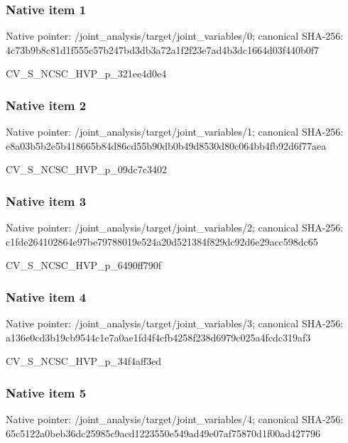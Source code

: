 \documentclass[10pt,a4paper]{article}
\begin{document}
\subsubsection{Native item 1}
Native pointer: /joint\_\allowbreak{}analysis/target/joint\_\allowbreak{}variables/0; canonical SHA-256: 4c73b9b8c81d1f555c57b247bd3db3a72a1f2f23e7ad4b3dc1664d03f440b0f7

\begingroup\raggedright\sloppy CV\_\allowbreak{}S\_\allowbreak{}NCSC\_\allowbreak{}HVP\_\allowbreak{}p\_\allowbreak{}321ee4d0e4\par\endgroup

\subsubsection{Native item 2}
Native pointer: /joint\_\allowbreak{}analysis/target/joint\_\allowbreak{}variables/1; canonical SHA-256: e8a03b5b2e5b418665b84d86cd55b90db0b49d8530d80c064bb4fb92d6f77aea

\begingroup\raggedright\sloppy CV\_\allowbreak{}S\_\allowbreak{}NCSC\_\allowbreak{}HVP\_\allowbreak{}p\_\allowbreak{}09dc7c3402\par\endgroup

\subsubsection{Native item 3}
Native pointer: /joint\_\allowbreak{}analysis/target/joint\_\allowbreak{}variables/2; canonical SHA-256: c1fde264102864e97be79788019e524a20d521384f829dc92d6e29acc598dc65

\begingroup\raggedright\sloppy CV\_\allowbreak{}S\_\allowbreak{}NCSC\_\allowbreak{}HVP\_\allowbreak{}p\_\allowbreak{}6490ff790f\par\endgroup

\subsubsection{Native item 4}
Native pointer: /joint\_\allowbreak{}analysis/target/joint\_\allowbreak{}variables/3; canonical SHA-256: a136e0cd3b19cb9544c1e7a0ae1fd4f4cfb4258f238d6979c025a4fcdc319af3

\begingroup\raggedright\sloppy CV\_\allowbreak{}S\_\allowbreak{}NCSC\_\allowbreak{}HVP\_\allowbreak{}p\_\allowbreak{}34f4aff3ed\par\endgroup

\subsubsection{Native item 5}
Native pointer: /joint\_\allowbreak{}analysis/target/joint\_\allowbreak{}variables/4; canonical SHA-256: 65c5122a0beb36dc25985c9acd1223550e549ad49e07af75870d1f00ad427796
\end{document}
